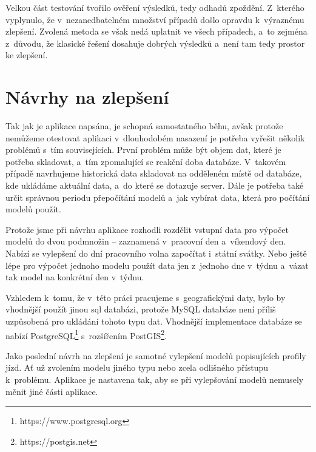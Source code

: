 Velkou část testování tvořilo ověření výsledků, tedy odhadů zpoždění. Z~kterého vyplynulo, že v~nezanedbatelném množství případů došlo opravdu k~výraznému zlepšení. Zvolená metoda se však nedá uplatnit ve všech případech, a~to zejména z~důvodu, že klasické řešení dosahuje dobrých výsledků a~není tam tedy prostor ke zlepšení.


\section*{Návrhy na zlepšení}

Tak jak je aplikace napsána, je schopná samostatného běhu, avšak protože nemůžeme otestovat aplikaci v~dlouhodobém nasazení je potřeba vyřešit několik problémů s~tím souvisejících. První problém může být objem dat, které je potřeba skladovat, a~tím zpomalující se reakční doba databáze. V~takovém případě navrhujeme historická data skladovat na odděleném místě od databáze, kde ukládáme aktuální data, a~do které se dotazuje server. Dále je potřeba také určit správnou periodu přepočítání modelů a~jak vybírat data, která pro počítání modelů použít.


\bigbreak

Protože jsme při návrhu aplikace rozhodli rozdělit vstupní data pro výpočet modelů do dvou podmnožin -- zaznamená v~pracovní den a~víkendový den. Nabízí se vylepšení do dní pracovního volna započítat i~státní svátky. Nebo ještě lépe pro výpočet jednoho modelu použít data jen z~jednoho dne v~týdnu a~vázat tak model na konkrétní den v~týdnu.
\bigbreak


Vzhledem k~tomu, že v~této práci pracujeme s~geografickými daty, bylo by vhodnější použít jinou \gls{sql} databázi, protože MySQL databáze není příliš uzpůsobená pro ukládání tohoto typu dat. Vhodnější implementace databáze se nabízí PostgreSQL\footnote{https://www.postgresql.org} s~rozšířením PostGIS\footnote{https://postgis.net}.

\bigbreak

Jako poslední návrh na zlepšení je samotné vylepšení modelů popisujících profily jízd. Ať už zvolením modelu jiného typu nebo zcela odlišného přístupu k~problému. Aplikace je nastavena tak, aby se při vylepšování modelů nemusely měnit jiné části aplikace.
